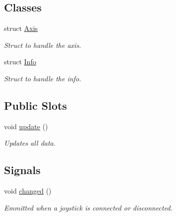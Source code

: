 \subsection*{Classes}
\begin{DoxyCompactItemize}
\item 
struct \hyperlink{struct_x_joystick_1_1_axis}{Axis}
\begin{DoxyCompactList}\small\item\em Struct to handle the axis. \end{DoxyCompactList}\item 
struct \hyperlink{struct_x_joystick_1_1_info}{Info}
\begin{DoxyCompactList}\small\item\em Struct to handle the info. \end{DoxyCompactList}\end{DoxyCompactItemize}
\subsection*{Public Slots}
\begin{DoxyCompactItemize}
\item 
void \hyperlink{class_x_joystick_a2052bd66345c8447a91902289ec6516f}{update} ()
\begin{DoxyCompactList}\small\item\em Updates all data. \end{DoxyCompactList}\end{DoxyCompactItemize}
\subsection*{Signals}
\begin{DoxyCompactItemize}
\item 
void \hyperlink{class_x_joystick_a46cf0117954ff155a3b55e9125e0b8d3}{changed} ()
\begin{DoxyCompactList}\small\item\em Emmitted when a joystick is connected or disconnected. \end{DoxyCompactList}\end{DoxyCompactItemize}

